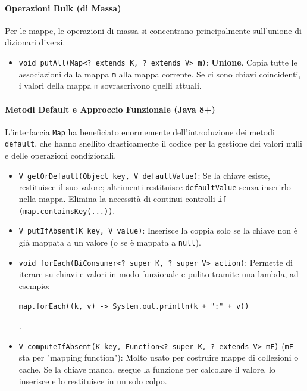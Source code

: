 \paragraph{Operazioni Bulk (di Massa)}

Per le mappe, le operazioni di massa si concentrano principalmente sull'unione di dizionari diversi.

\begin{itemize}
    \item \texttt{void putAll(Map<? extends K, ? extends V> m)}: \textbf{Unione}. Copia tutte le associazioni dalla mappa \texttt{m} alla mappa corrente. Se ci sono chiavi coincidenti, i valori della mappa \texttt{m} sovrascrivono quelli attuali.
\end{itemize}

\paragraph{Metodi Default e Approccio Funzionale (Java 8+)}

L'interfaccia \texttt{Map} ha beneficiato enormemente dell'introduzione dei metodi \texttt{default}, che hanno snellito drasticamente il codice per la gestione dei valori nulli e delle operazioni condizionali.

\begin{itemize}
    \item \texttt{V getOrDefault(Object key, V defaultValue)}: Se la chiave esiste, restituisce il suo valore; altrimenti restituisce \texttt{defaultValue} senza inserirlo nella mappa. Elimina la necessità di continui controlli \texttt{if (map.containsKey(...))}.
    \item \texttt{V putIfAbsent(K key, V value)}: Inserisce la coppia solo se la chiave non è già mappata a un valore (o se è mappata a \texttt{null}).
    \item \texttt{void forEach(BiConsumer<? super K, ? super V> action)}: Permette di iterare su chiavi e valori in modo funzionale e pulito tramite una lambda, ad esempio: \begin{center}
                \texttt{map.forEach((k, v) -> System.out.println(k + ":" + v))}   
            \end{center}.
    \item \texttt{V computeIfAbsent(K key, Function<? super K, ? extends V> mF)} (\texttt{mF} sta per "mapping function"): Molto usato per costruire mappe di collezioni o cache. Se la chiave manca, esegue la funzione per calcolare il valore, lo inserisce e lo restituisce in un solo colpo.
\end{itemize}

